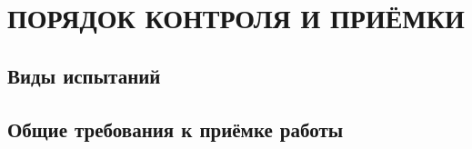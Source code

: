 \section{ПОРЯДОК КОНТРОЛЯ И ПРИЁМКИ}

\subsection{Виды испытаний}


\subsection{Общие требования к приёмке работы}
    
\clearpage